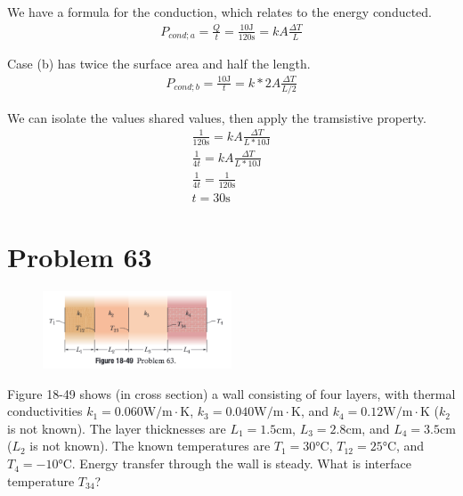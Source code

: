 \documentclass[12pt]{article}
\begin{document}
            We have a formula for the conduction, which relates to the energy conducted.
            \begin{gather}
                P_{cond;a}    =   \frac{Q}{t}
                    =   \frac{10 \unit{\joule}}{120 \unit{\second}}
                    =   kA\frac{\Delta T}{L}
            \end{gather}

            Case (b) has twice the surface area and half the length.
            \begin{gather}
                P_{cond;b}  =   \frac{10 \unit{\joule}}{t}
                    =   k*2A\frac{\Delta T}{L/2}
            \end{gather}

            We can isolate the values shared values, then apply the tramsistive property.
            \begin{gather}
                \frac{1}{120 \unit{\second}}    =   kA\frac{\Delta T}{L * 10 \unit{\joule}}\\
                \frac{1}{4t}    =   kA\frac{\Delta T}{L * 10 \unit{\joule}}\\
                \frac{1}{4t}    =   \frac{1}{120 \unit{\second}}\\
                t   =   \boxed{30 \unit{\second}}
            \end{gather}


    \pagebreak
    \section{Problem 63}
        \begin{figure}
            \vspace{-30pt}
            \includegraphics[width=0.5\textwidth]{picture_18-49.png} 
        \end{figure}
        Figure 18-49 shows (in cross section) a wall consisting of four layers, with thermal conductivities $k_1 = 0.060 \unit{\watt/\meter\cdot\kelvin}$, $k_3 = 0.040 \unit{\watt/\meter\cdot\kelvin}$, and $k_4 = 0.12 \unit{\watt/\meter\cdot\kelvin}$ ($k_2$ is not known). 
        The layer thicknesses are $L_1 = 1.5 \unit{\centi\meter}$, $L_3 = 2.8 \unit{\centi\meter}$, and $L_4 = 3.5 \unit{\centi\meter}$ ($L_2$ is not known). 
        The known temperatures are $T_1 = 30 \unit{\celsius}$, $T_{12} = 25 \unit{\celsius}$, and $T_4 = -10\unit{\celsius}$. 
        Energy transfer through the wall is steady. 
        What is interface temperature $T_{34}$?
\end{document}
